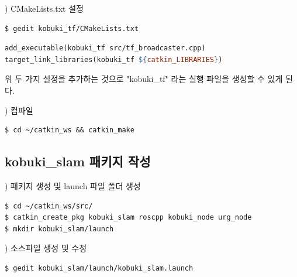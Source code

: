 \vspace{\baselineskip}
\noindent
{}
\thenum) CMakeLists.txt 설정

\vspace{\baselineskip}
\begin{lstlisting}[language=ROS]
$ gedit kobuki_tf/CMakeLists.txt 
\end{lstlisting}


\vspace{\baselineskip}
\begin{lstlisting}[language=make]
add_executable(kobuki_tf src/tf_broadcaster.cpp)
target_link_libraries(kobuki_tf ${catkin_LIBRARIES})
\end{lstlisting}


위 두 가지 설정을 추가하는 것으로 "kobuki\_tf" 라는 실행 파일을 생성할 수 있게 된다.

\vspace{\baselineskip}
\noindent
{}
\thenum) 컴파일

\vspace{\baselineskip}
\begin{lstlisting}[language=ROS]
$ cd ~/catkin_ws && catkin_make
\end{lstlisting}



\subsection{kobuki\_slam 패키지 작성}

\setcounter{num}{0}

\vspace{\baselineskip}
\noindent
{}
\thenum) 패키지 생성 및 launch 파일 폴더 생성

\vspace{\baselineskip}
\begin{lstlisting}[language=ROS]
$ cd ~/catkin_ws/src/
$ catkin_create_pkg kobuki_slam roscpp kobuki_node urg_node
$ mkdir kobuki_slam/launch
\end{lstlisting}


\vspace{\baselineskip}
\noindent
{}
\thenum) 소스파일 생성 및 수정

\vspace{\baselineskip}
\begin{lstlisting}[language=ROS]
$ gedit kobuki_slam/launch/kobuki_slam.launch
\end{lstlisting}



